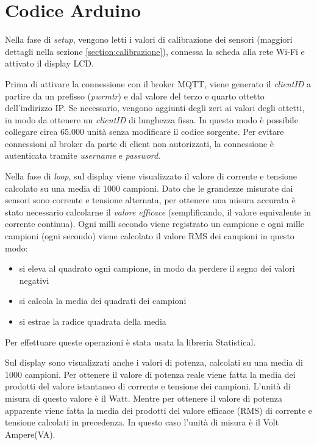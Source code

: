 \documentclass[italian,12pt,a4paper,oneside,final]{report}
\begin{document}
\section{Codice Arduino}
Nella fase di \textit{setup}, vengono letti i valori di calibrazione dei sensori (maggiori dettagli nella sezione \ref{section:calibrazione}), connessa la scheda alla rete Wi-Fi e attivato il display LCD.

Prima di attivare la connessione con il broker MQTT, viene generato il \textit{clientID} a partire da un prefisso (\emph{pwrmtr}) e dal valore del terzo e quarto ottetto dell'indirizzo IP.
Se necessario, vengono aggiunti degli zeri ai valori degli ottetti, in modo da ottenere un \textit{clientID} di lunghezza fissa.
In questo modo è possibile collegare circa 65.000 unità senza modificare il codice sorgente.
Per evitare connessioni al broker da parte di client non autorizzati, la connessione è autenticata tramite \textit{username} e \textit{password}.

Nella fase di \textit{loop}, sul display viene visualizzato il valore di corrente e tensione calcolato su una media di 1000 campioni.
Dato che le grandezze misurate dai sensori sono corrente e tensione alternata, per ottenere una misura accurata è stato necessario calcolarne il \emph{valore efficace} (semplificando, il valore equivalente in corrente continua).
Ogni milli secondo viene registrato un campione e ogni mille campioni (ogni secondo) viene calcolato il valore RMS dei campioni in questo modo:
\begin{itemize}
  \item si eleva al quadrato ogni campione, in modo da perdere il segno dei valori negativi
  \item si calcola la media dei quadrati dei campioni
  \item si estrae la radice quadrata della media
\end{itemize}

\noindent Per effettuare queste operazioni è stata usata la libreria Statistical.

Sul display sono visualizzati anche i valori di potenza, calcolati su una media di 1000 campioni.
Per ottenere il valore di potenza reale viene fatta la media dei prodotti del valore istantaneo di corrente e tensione dei campioni.
L'unità di misura di questo valore è il Watt.
Mentre per ottenere il valore di potenza apparente viene fatta la media dei prodotti del valore efficace (RMS) di corrente e tensione calcolati in precedenza.
In questo caso l'unità di misura è il Volt Ampere(VA).
\end{document}
